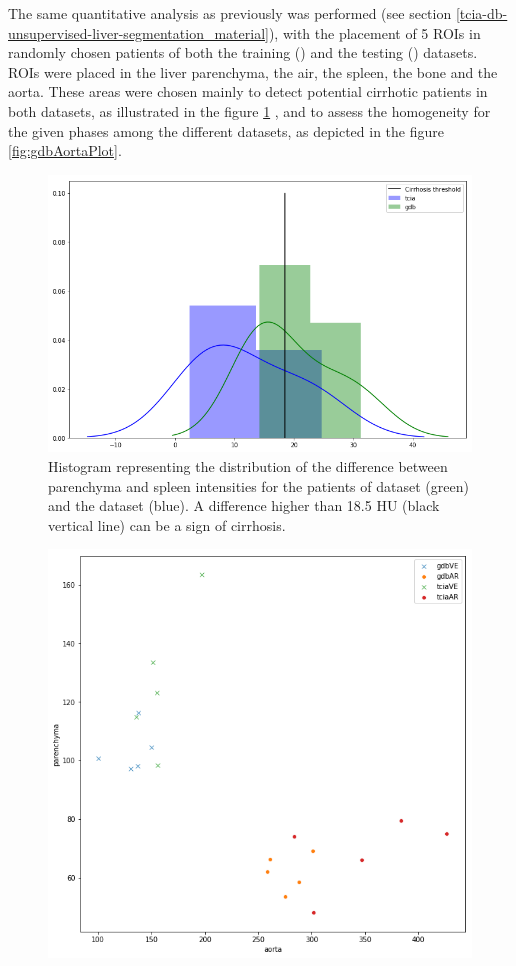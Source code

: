 {The same quantitative analysis as previously was performed (see section \ref{tcia-db-unsupervised-liver-segmentation_material}), with the placement of 5 ROIs in randomly chosen patients of both the training (\textbf{}) and the testing (\textbf{}) datasets. ROIs were placed in the liver parenchyma, the air, the spleen, the bone and the aorta. These areas were chosen mainly to detect potential cirrhotic patients in both datasets, as illustrated in the figure \ref{fig:cirrhoticPatPlot} , and to assess the homogeneity for the given phases among the different datasets, as depicted in the figure \ref{fig:gdbAortaPlot}. 
\begin{figure}[!ht]
	\begin{mdframed}[backgroundcolor=blue!50,linecolor=blue!50]
		\centering
		\includegraphics[width=0.6\linewidth]{images/Gdb_TCIA_cirrhosisPlot}
		\caption{Histogram representing the distribution of the difference between parenchyma and spleen intensities for the patients of  \textbf{} dataset (green) and the  \textbf{} dataset (blue). A difference higher than 18.5 HU (black vertical line) can be a sign of cirrhosis.
		}
		\label{fig:cirrhoticPatPlot}
	\end{mdframed}
\end{figure}
\begin{figure}[!ht]
	\begin{mdframed}[backgroundcolor=blue!50,linecolor=blue!50]
		\centering
		\includegraphics[width=0.6\linewidth]{images/AortaParPlot_Gdb}

\end{mdframed}
\end{figure}}
